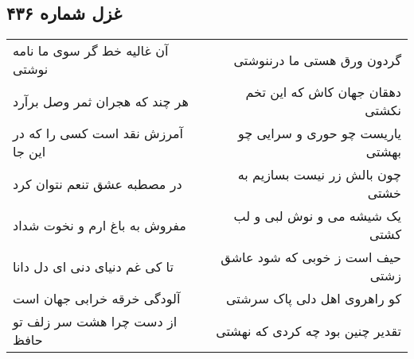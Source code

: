 \begin{center}
\section*{غزل شماره ۴۳۶}
\label{sec:sh436}
\begin{longtable}{l p{0.5cm} r}
آن غالیه خط گر سوی ما نامه نوشتی
&&
گردون ورق هستی ما درننوشتی
\\
هر چند که هجران ثمر وصل برآرد
&&
دهقان جهان کاش که این تخم نکشتی
\\
آمرزش نقد است کسی را که در این جا
&&
یاریست چو حوری و سرایی چو بهشتی
\\
در مصطبه عشق تنعم نتوان کرد
&&
چون بالش زر نیست بسازیم به خشتی
\\
مفروش به باغ ارم و نخوت شداد
&&
یک شیشه می و نوش لبی و لب کشتی
\\
تا کی غم دنیای دنی ای دل دانا
&&
حیف است ز خوبی که شود عاشق زشتی
\\
آلودگی خرقه خرابی جهان است
&&
کو راهروی اهل دلی پاک سرشتی
\\
از دست چرا هشت سر زلف تو حافظ
&&
تقدیر چنین بود چه کردی که نهشتی
\\
\end{longtable}
\end{center}
